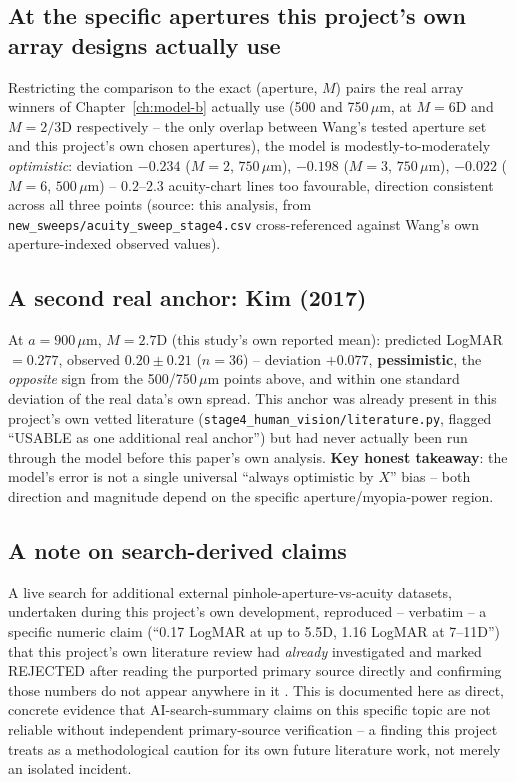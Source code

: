 \subsection{At the specific apertures this project's own array designs actually use}
Restricting the comparison to the exact (aperture, $M$) pairs the real array winners of
Chapter~\ref{ch:model-b} actually use (500 and 750\,$\mu$m, at $M=6$D and $M=2/3$D
respectively -- the only overlap between Wang's tested aperture set and this project's
own chosen apertures), the model is modestly-to-moderately \emph{optimistic}: deviation
$-0.234$ ($M=2$, $750\,\mu$m), $-0.198$ ($M=3$, $750\,\mu$m), $-0.022$ ($M=6$,
$500\,\mu$m) -- $0.2$--$2.3$ acuity-chart lines too favourable, direction consistent
across all three points (source: this analysis, from
\texttt{new\_sweeps/acuity\_sweep\_stage4.csv} cross-referenced against Wang's own
aperture-indexed observed values).

\subsection{A second real anchor: Kim (2017)}
At $a=900\,\mu$m, $M=2.7$D (this study's own reported mean): predicted LogMAR
$=0.277$, observed $0.20\pm0.21$ ($n=36$) -- deviation $+0.077$, \textbf{pessimistic},
the \emph{opposite} sign from the 500/750\,$\mu$m points above, and within one standard
deviation of the real data's own spread. This anchor was already present in this
project's own vetted literature (\texttt{stage4\_human\_vision/literature.py}, flagged
``USABLE as one additional real anchor'') but had never actually been run through the
model before this paper's own analysis. \textbf{Key honest takeaway}: the model's error
is not a single universal ``always optimistic by $X$'' bias -- both direction and
magnitude depend on the specific aperture/myopia-power region.

\subsection{A note on search-derived claims}
\label{sec:search-honesty}
A live search for additional external pinhole-aperture-vs-acuity datasets, undertaken
during this project's own development, reproduced -- verbatim -- a specific numeric
claim (``0.17 LogMAR at up to 5.5D, 1.16 LogMAR at 7--11D'') that this project's own
literature review had \emph{already} investigated and marked REJECTED after reading the
purported primary source directly and confirming those numbers do not appear anywhere
in it \citep{neuroquantology2022rejected}. This is documented here as direct, concrete
evidence that AI-search-summary claims on this specific topic are not reliable without
independent primary-source verification -- a finding this project treats as a
methodological caution for its own future literature work, not merely an isolated
incident.

